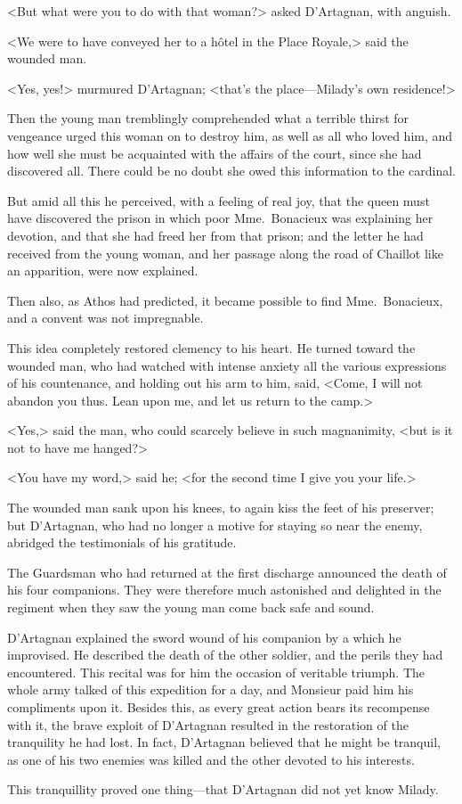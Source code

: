 <But what were you to do with that woman?> asked D'Artagnan, with anguish. 

<We were to have conveyed her to a hôtel in the Place Royale,> said the wounded man. 

<Yes, yes!> murmured D'Artagnan; <that's the place—Milady's own residence!> 

Then the young man tremblingly comprehended what a terrible thirst for vengeance urged this woman on to destroy him, as well as all who loved him, and how well she must be acquainted with the affairs of the court, since she had discovered all. There could be no doubt she owed this information to the cardinal. 

But amid all this he perceived, with a feeling of real joy, that the queen must have discovered the prison in which poor Mme.~Bonacieux was explaining her devotion, and that she had freed her from that prison; and the letter he had received from the young woman, and her passage along the road of Chaillot like an apparition, were now explained. 

Then also, as Athos had predicted, it became possible to find Mme.~Bonacieux, and a convent was not impregnable. 

This idea completely restored clemency to his heart. He turned toward the wounded man, who had watched with intense anxiety all the various expressions of his countenance, and holding out his arm to him, said, <Come, I will not abandon you thus. Lean upon me, and let us return to the camp.> 

<Yes,> said the man, who could scarcely believe in such magnanimity, <but is it not to have me hanged?> 

<You have my word,> said he; <for the second time I give you your life.> 

The wounded man sank upon his knees, to again kiss the feet of his preserver; but D'Artagnan, who had no longer a motive for staying so near the enemy, abridged the testimonials of his gratitude. 

The Guardsman who had returned at the first discharge announced the death of his four companions. They were therefore much astonished and delighted in the regiment when they saw the young man come back safe and sound. 

D'Artagnan explained the sword wound of his companion by a  which he improvised. He described the death of the other soldier, and the perils they had encountered. This recital was for him the occasion of veritable triumph. The whole army talked of this expedition for a day, and Monsieur paid him his compliments upon it. Besides this, as every great action bears its recompense with it, the brave exploit of D'Artagnan resulted in the restoration of the tranquility he had lost. In fact, D'Artagnan believed that he might be tranquil, as one of his two enemies was killed and the other devoted to his interests. 

This tranquillity proved one thing—that D'Artagnan did not yet know Milady. 